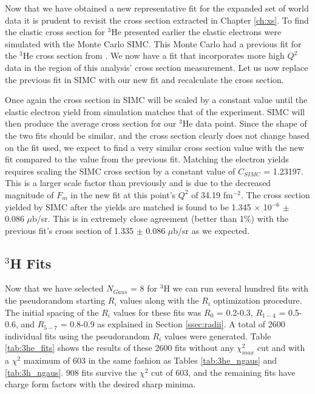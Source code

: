 Now that we have obtained a new representative fit for the expanded set of world data it is prudent to revisit the cross section extracted in Chapter \ref{ch:xs}. To find the elastic cross section for $^3$He presented earlier the elastic electrons were simulated with the Monte Carlo SIMC. This Monte Carlo had a previous fit for the $^3$He cross section from \cite{Article:Amroun}. We now have a fit that incorporates more high $Q^2$ data in the region of this analysis' cross section measurement. Let us now replace the previous fit in SIMC with our new fit and recalculate the cross section.

Once again the cross section in SIMC will be scaled by a constant value until the elastic electron yield from simulation matches that of the experiment. SIMC will then produce the average cross section for our $^3$He data point. Since the shape of the two fits should be similar, and the cross section clearly does not change based on the fit used, we expect to find a very similar cross section value with the new fit compared to the value from the previous fit. Matching the electron yields requires scaling the SIMC cross section by a constant value of $C_{SIMC}$ = 1.23197. This is a larger scale factor than previously and is due to the decreased magnitude of $F_m$ in the new fit at this point's $Q^2$ of 34.19 fm$^{-2}$. The cross section yielded by SIMC after the yields are matched is found to be 1.345 $\times$ 10$^{-6}$ $\pm$ 0.086 $\mu$b/sr. This is in extremely close agreement (better than 1$\%$) with the previous fit's cross section of 1.335 $\pm$ 0.086 $\mu$b/sr as we expected.

\subsection{$^3$H Fits}
\label{ssec:3h_fits}

Now that we have selected $N_{Gaus}$ = 8 for $^3$H we can run several hundred fits with the pseudorandom starting $R_i$ values along with the $R_i$ optimization procedure. The initial spacing of the $R_i$ values for these fits was $R_0$ = 0.2-0.3, $R_{1-4}$ = 0.5-0.6, and $R_{5-7}$ = 0.8-0.9 as explained in Section \ref{ssec:radii}. A total of 2600 individual fits using the pseudorandom $R_i$ values were generated. Table \ref{tab:3he_fits} shows the results of these 2600 fits without any $\chi^2_{max}$ cut and with a $\chi^2$ maximum of 603 in the same fashion as Tables \ref{tab:3he_ngaus} and \ref{tab:3h_ngaus}. 908 fits survive the $\chi^2$ cut of 603, and the remaining fits have charge form factors with the desired sharp minima.

